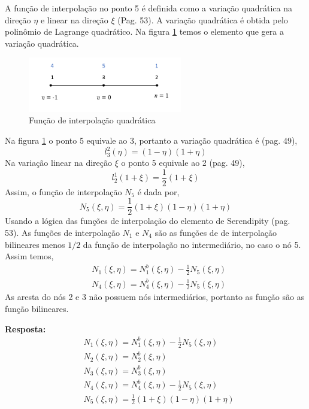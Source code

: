 %
A função de interpolação no ponto 5 é definida como a variação quadrática na direção $\eta$ e linear na direção $\xi$ (Pag. 53). A variação quadrática é obtida pelo polinômio de Lagrange quadrático. Na figura \ref{cap6:Quadratico} temos o elemento que gera a variação quadrática.
%
\begin{figure}[H]
	\includegraphics[width=0.6\textwidth,center]{fig/elemento_quad.PNG}
	\caption{Função de interpolação quadrática} 
	\label{cap6:Quadratico}
\end{figure}
%

Na figura \ref{cap6:Quadratico} o ponto 5 equivale ao 3, portanto a variação quadrática é (pag. 49),
%
\begin{equation}
	l^2_3(\eta) = (1-\eta)(1+\eta)
\end{equation}
%
Na variação linear na direção $\xi$ o ponto 5 equivale ao 2 (pag. 49),
%
\begin{equation}
	l^1_2(1+\xi) = \frac{1}{2}(1+\xi)
\end{equation}
%
Assim, o função de interpolação $N_5$ é dada por,
%
\begin{equation}
	N_5(\xi,\eta) = \frac{1}{2}(1+\xi)(1-\eta)(1+\eta)
\end{equation}
%
Usando a lógica das funções de interpolação do elemento de Serendipity (pag. 53). As  funções de interpolação $N_1$ e $N_4$ são as funções de de interpolação bilineares menos ${1/2}$ da função de interpolação no intermediário, no caso o nó 5. Assim temos,
%
\begin{equation}
	\begin{split}
	&N_1(\xi,\eta) = N^b_1(\xi,\eta) - \frac{1}{2}  N_5(\xi,\eta)\\
	&N_4(\xi,\eta) = N^b_4(\xi,\eta) - \frac{1}{2}  N_5(\xi,\eta)
	\end{split}
\end{equation}
%	
As aresta do nós 2 e 3 não possuem nós intermediários, portanto as função são as função bilineares. 

\color{blue}
\textbf{Resposta:}
\begin{equation}
	\begin{split}
		&N_1(\xi,\eta) = N^b_1(\xi,\eta) - \frac{1}{2}  N_5(\xi,\eta)\\
		&N_2(\xi,\eta) = N^b_2(\xi,\eta)\\
		&N_3(\xi,\eta) = N^b_3(\xi,\eta)\\
		&N_4(\xi,\eta) = N^b_4(\xi,\eta) - \frac{1}{2}  N_5(\xi,\eta)\\
		&N_5(\xi,\eta) = \frac{1}{2}(1+\xi)(1-\eta)(1+\eta)\\
	\end{split}
\end{equation}
\color{black}

